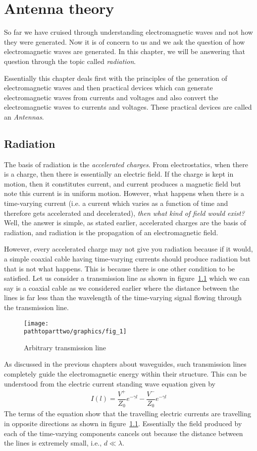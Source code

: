 \chapter{Antenna theory}
So far we have cruised through understanding electromagnetic waves and not how they were generated. Now it is of concern to us and we ask the question of how electromagnetic waves are generated. In this chapter, we will be answering that question through the topic called \emph{radiation}. 

Essentially this chapter deals first with the principles of the generation of electromagnetic waves and then practical devices which can generate electromagnetic waves from currents and voltages and also convert the electromagnetic waves to currents and voltages. These practical devices are called an \emph{Antennas}.

\section{Radiation}
The basis of radiation is the \emph{accelerated charges}. From electrostatics, when there is a charge, then there is essentially an electric field. If the charge is kept in motion, then it constitutes current, and current produces a magnetic field but note this current is in uniform motion. However, what happens when there is a time-varying current (i.e. a current which varies as a function of time and therefore gets accelerated and decelerated), \emph{then what kind of field would exist?} Well, the answer is simple, as stated earlier, accelerated charges are the basis of radiation, and radiation is the propagation of an electromagnetic field.

However, every accelerated charge may not give you radiation because if it would, a simple coaxial cable having time-varying currents should produce radiation but that is not what happens. This is because there is one other condition to be satisfied. Let us consider a transmission line as shown in figure~\ref{fig:txnsline} which we can say is a coaxial cable as we considered earlier where the distance between the lines is far less than the wavelength of the time-varying signal flowing through the transmission line.
\begin{figure}[h]
\centering
\texttt{[image: \\pathtoparttwo/graphics/fig\_1]}
\caption{Arbitrary transmission line}
\label{fig:txnsline}
\end{figure}

As discussed in the previous chapters about waveguides, such transmission lines completely guide the electromagnetic energy within their structure. This can be understood from the electric current standing wave equation given by
\begin{align*}
I(l)=\dfrac{V^+}{Z_0}e^{-\gamma l} - \dfrac{V^-}{Z_0}e^{-\gamma l}
\end{align*}
The terms of the equation show that the travelling electric currents are travelling in opposite directions as shown in figure~\ref{fig:txnsline}. Essentially the field produced by each of the time-varying components cancels out because the distance between the lines is extremely small, i.e., $d\ll\lambda$. 

